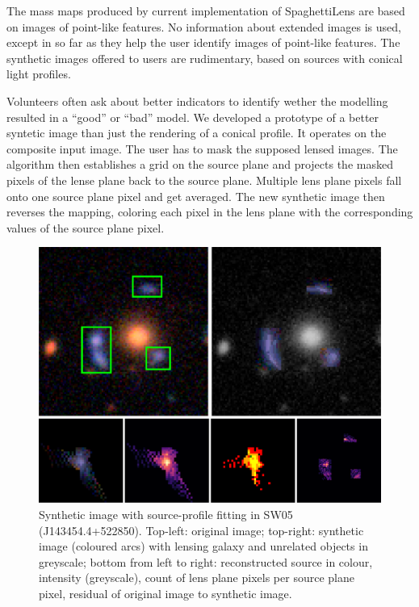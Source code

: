 \documentclass[fleqn,usenatbib]{mnras}
\begin{document}
The mass maps produced by current implementation of SpaghettiLens are
based on images of point-like features.  No information about extended
images is used, except in so far as they help the user identify images
of point-like features.  The synthetic images offered to users are
rudimentary, based on sources with conical light profiles.

Volunteers often ask about better indicators to identify wether the
modelling resulted in a ``good'' or ``bad'' model.  We developed a
prototype of a better syntetic image than just the rendering of a
conical profile.  It operates on the composite input image.  The user
has to mask the supposed lensed images.  The algorithm then
establishes a grid on the source plane and projects the masked pixels
of the lense plane back to the source plane.  Multiple lens plane
pixels fall onto one source plane pixel and get averaged.  The new
synthetic image then reverses the mapping, coloring each pixel in the
lens plane with the corresponding values of the source plane pixel.

\begin{figure}
  \includegraphics[width=\linewidth]{img/new_synth_img_detailed}
  \caption{Synthetic image with source-profile fitting in SW05
    (J143454.4+522850). Top-left: original image; top-right: synthetic
    image (coloured arcs) with lensing galaxy and unrelated objects in
    greyscale; bottom from left to right: reconstructed source in
    colour, intensity (greyscale), count of lens plane pixels per
    source plane pixel, residual of original image to synthetic
    image.}
  \label{fig:synthimg}
\end{figure}
\end{document}
